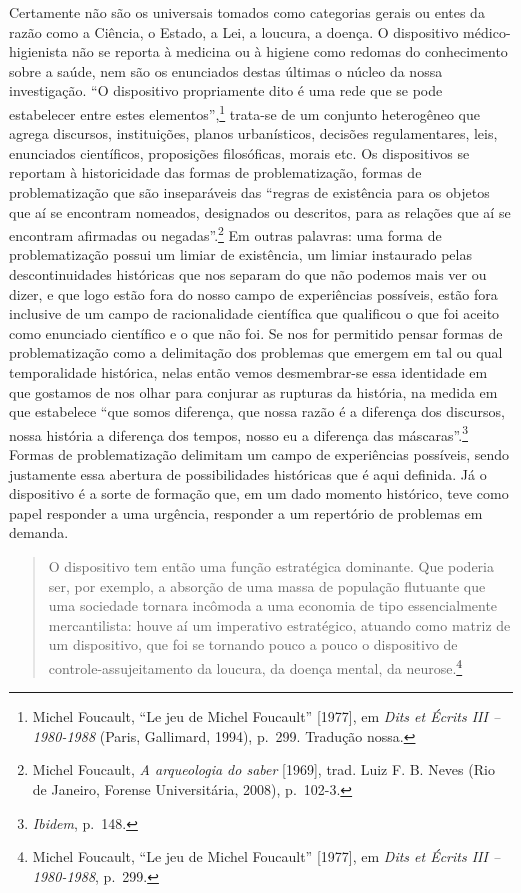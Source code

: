 Certamente não são os universais tomados como categorias gerais ou entes
da razão como a Ciência, o Estado, a Lei, a loucura, a doença. O
dispositivo médico-higienista não se reporta à medicina ou à higiene
como redomas do conhecimento sobre a saúde, nem são os enunciados destas
últimas o núcleo da nossa investigação. ``O dispositivo propriamente
dito é uma rede que se pode estabelecer entre estes
elementos'',\footnote{Michel Foucault, ``Le jeu de Michel Foucault''
  {[}1977{]}, em \emph{Dits et Écrits III -- 1980-1988} (Paris,
  Gallimard, 1994), p.~299. Tradução nossa.} trata-se de um conjunto
heterogêneo que agrega discursos, instituições, planos urbanísticos,
decisões regulamentares, leis, enunciados científicos, proposições
filosóficas, morais etc. Os dispositivos se reportam à historicidade das
formas de problematização, formas de problematização que são
inseparáveis das ``regras de existência para os objetos que aí se
encontram nomeados, designados ou descritos, para as relações que aí se
encontram afirmadas ou negadas''.\footnote{Michel Foucault, \emph{A
  arqueologia do saber} {[}1969{]}, trad. Luiz F. B. Neves (Rio de
  Janeiro, Forense Universitária, 2008), p.~102-3.} Em outras palavras:
uma forma de problematização possui um limiar de existência, um limiar
instaurado pelas descontinuidades históricas que nos separam do que não
podemos mais ver ou dizer, e que logo estão fora do nosso campo de
experiências possíveis, estão fora inclusive de um campo de
racionalidade científica que qualificou o que foi aceito como enunciado
científico e o que não foi. Se nos for permitido pensar formas de
problematização como a delimitação dos problemas que emergem em tal ou
qual temporalidade histórica, nelas então vemos desmembrar-se essa
identidade em que gostamos de nos olhar para conjurar as rupturas da
história, na medida em que estabelece ``que somos diferença, que nossa
razão é a diferença dos discursos, nossa história a diferença dos
tempos, nosso eu a diferença das máscaras''.\footnote{\emph{Ibidem},
  p.~148.} Formas de problematização delimitam um campo de experiências
possíveis, sendo justamente essa abertura de possibilidades históricas
que é aqui definida. Já o dispositivo é a sorte de formação que, em um
dado momento histórico, teve como papel responder a uma urgência,
responder a um repertório de problemas em demanda.

\begin{quote}
O dispositivo tem então uma função estratégica dominante. Que poderia
ser, por exemplo, a absorção de uma massa de população flutuante que uma
sociedade tornara incômoda a uma economia de tipo essencialmente
mercantilista: houve aí um imperativo estratégico, atuando como matriz
de um dispositivo, que foi se tornando pouco a pouco o dispositivo de
controle-assujeitamento da loucura, da doença mental, da
neurose.\footnote{Michel Foucault, ``Le jeu de Michel Foucault''
  {[}1977{]}, em \emph{Dits et Écrits III -- 1980-1988}, p.~299.}
\end{quote}


